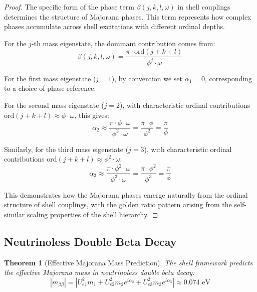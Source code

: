 \documentclass[12pt,a4paper]{article}
\newtheorem{theorem}{Theorem}[section]
\newcommand{\ord}{\text{ord}}
\begin{document}
\begin{proof}
The specific form of the phase term $\beta(j,k,l,\omega)$ in shell couplings determines the structure of Majorana phases. This term represents how complex phases accumulate across shell excitations with different ordinal depths.

For the $j$-th mass eigenstate, the dominant contribution comes from:
\begin{equation}
\beta(j,k,l,\omega) = \frac{\pi \cdot \ord(j+k+l)}{\phi^j \cdot \omega}
\end{equation}

For the first mass eigenstate ($j=1$), by convention we set $\alpha_1 = 0$, corresponding to a choice of phase reference.

For the second mass eigenstate ($j=2$), with characteristic ordinal contributions $\ord(j+k+l) \approx \phi \cdot \omega$, this gives:
\begin{equation}
\alpha_2 \approx \frac{\pi \cdot \phi \cdot \omega}{\phi^2 \cdot \omega} = \frac{\pi \cdot \phi}{\phi^2} = \frac{\pi}{\phi}
\end{equation}

Similarly, for the third mass eigenstate ($j=3$), with characteristic ordinal contributions $\ord(j+k+l) \approx \phi^2 \cdot \omega$:
\begin{equation}
\alpha_3 \approx \frac{\pi \cdot \phi^2 \cdot \omega}{\phi^3 \cdot \omega} = \frac{\pi \cdot \phi^2}{\phi^3} = \frac{\pi}{\phi}
\end{equation}

This demonstrates how the Majorana phases emerge naturally from the ordinal structure of shell couplings, with the golden ratio pattern arising from the self-similar scaling properties of the shell hierarchy.
\end{proof}

\subsection{Neutrinoless Double Beta Decay}
\label{subsec:0vbb}

\begin{theorem}[Effective Majorana Mass Prediction]
\label{thm:effective-mass}
The shell framework predicts the effective Majorana mass in neutrinoless double beta decay:
\begin{equation}
|m_{\beta\beta}| = \left|U_{e1}^2 m_1 + U_{e2}^2 m_2 e^{i\alpha_2} + U_{e3}^2 m_3 e^{i\alpha_3}\right| \approx 0.074 \text{ eV}
\end{equation}
\end{theorem}
\end{document}
